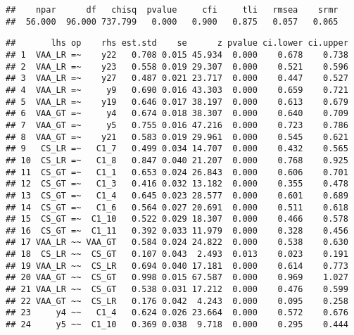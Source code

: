 \documentclass[
]{article}
\newenvironment{Shaded}{\begin{snugshade}}{\end{snugshade}}
\newcommand{\FloatTok}[1]{\textcolor[rgb]{0.00,0.00,0.81}{#1}}
\newcommand{\KeywordTok}[1]{\textcolor[rgb]{0.13,0.29,0.53}{\textbf{#1}}}
\newcommand{\NormalTok}[1]{#1}
\newcommand{\OperatorTok}[1]{\textcolor[rgb]{0.81,0.36,0.00}{\textbf{#1}}}
\newcommand{\StringTok}[1]{\textcolor[rgb]{0.31,0.60,0.02}{#1}}
\begin{document}
\begin{verbatim}
##    npar      df   chisq  pvalue     cfi     tli   rmsea    srmr 
##  56.000  96.000 737.799   0.000   0.900   0.875   0.057   0.065
\end{verbatim}

\begin{Shaded}
\end{Shaded}

\begin{verbatim}
##       lhs op    rhs est.std    se      z pvalue ci.lower ci.upper
## 1  VAA_LR =~    y22   0.708 0.015 45.934  0.000    0.678    0.738
## 2  VAA_LR =~    y23   0.558 0.019 29.307  0.000    0.521    0.596
## 3  VAA_LR =~    y27   0.487 0.021 23.717  0.000    0.447    0.527
## 4  VAA_LR =~     y9   0.690 0.016 43.303  0.000    0.659    0.721
## 5  VAA_LR =~    y19   0.646 0.017 38.197  0.000    0.613    0.679
## 6  VAA_GT =~     y4   0.674 0.018 38.307  0.000    0.640    0.709
## 7  VAA_GT =~     y5   0.755 0.016 47.216  0.000    0.723    0.786
## 8  VAA_GT =~    y21   0.583 0.019 29.961  0.000    0.545    0.621
## 9   CS_LR =~   C1_7   0.499 0.034 14.707  0.000    0.432    0.565
## 10  CS_LR =~   C1_8   0.847 0.040 21.207  0.000    0.768    0.925
## 11  CS_GT =~   C1_1   0.653 0.024 26.843  0.000    0.606    0.701
## 12  CS_GT =~   C1_3   0.416 0.032 13.182  0.000    0.355    0.478
## 13  CS_GT =~   C1_4   0.645 0.023 28.577  0.000    0.601    0.689
## 14  CS_GT =~   C1_6   0.564 0.027 20.691  0.000    0.511    0.618
## 15  CS_GT =~  C1_10   0.522 0.029 18.307  0.000    0.466    0.578
## 16  CS_GT =~  C1_11   0.392 0.033 11.979  0.000    0.328    0.456
## 17 VAA_LR ~~ VAA_GT   0.584 0.024 24.822  0.000    0.538    0.630
## 18  CS_LR ~~  CS_GT   0.107 0.043  2.493  0.013    0.023    0.191
## 19 VAA_LR ~~  CS_LR   0.694 0.040 17.181  0.000    0.614    0.773
## 20 VAA_GT ~~  CS_GT   0.998 0.015 67.587  0.000    0.969    1.027
## 21 VAA_LR ~~  CS_GT   0.538 0.031 17.212  0.000    0.476    0.599
## 22 VAA_GT ~~  CS_LR   0.176 0.042  4.243  0.000    0.095    0.258
## 23     y4 ~~   C1_4   0.624 0.026 23.664  0.000    0.572    0.676
## 24     y5 ~~  C1_10   0.369 0.038  9.718  0.000    0.295    0.444
\end{verbatim}
\end{document}

